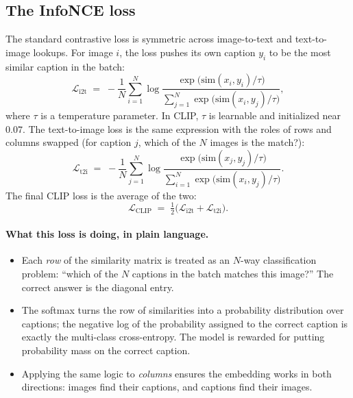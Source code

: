 \documentclass[11pt]{article}
\theoremstyle{remark}
\newcommand{\simop}{\mathrm{sim}}
\begin{document}
\subsection{The InfoNCE loss}
The standard contrastive loss is symmetric across image-to-text and text-to-image lookups. For image $i$, the loss pushes its own caption $y_i$ to be the most similar caption in the batch:
\begin{equation}
\mathcal{L}_{\text{i2t}} \;=\; -\frac{1}{N}\sum_{i=1}^{N} \log
\frac{\exp\!\big(\simop(x_i, y_i)/\tau\big)}{\sum_{j=1}^{N}\exp\!\big(\simop(x_i, y_j)/\tau\big)},
\label{eq:i2t}
\end{equation}
where $\tau$ is a temperature parameter. In CLIP, $\tau$ is learnable and initialized near $0.07$. The text-to-image loss is the same expression with the roles of rows and columns swapped (for caption $j$, which of the $N$ images is the match?):
\begin{equation}
\mathcal{L}_{\text{t2i}} \;=\; -\frac{1}{N}\sum_{j=1}^{N} \log
\frac{\exp\!\big(\simop(x_j, y_j)/\tau\big)}{\sum_{i=1}^{N}\exp\!\big(\simop(x_i, y_j)/\tau\big)}.
\label{eq:t2i}
\end{equation}
The final CLIP loss is the average of the two:
\begin{equation}
\mathcal{L}_{\text{CLIP}} \;=\; \tfrac{1}{2}\big(\mathcal{L}_{\text{i2t}} + \mathcal{L}_{\text{t2i}}\big).
\label{eq:clip}
\end{equation}

\paragraph{What this loss is doing, in plain language.}
\begin{itemize}[leftmargin=1.4em]
  \item Each \emph{row} of the similarity matrix is treated as an $N$-way classification problem: ``which of the $N$ captions in the batch matches this image?'' The correct answer is the diagonal entry.
  \item The softmax turns the row of similarities into a probability distribution over captions; the negative log of the probability assigned to the correct caption is exactly the multi-class cross-entropy. The model is rewarded for putting probability mass on the correct caption.
  \item Applying the same logic to \emph{columns} ensures the embedding works in both directions: images find their captions, and captions find their images.
\end{itemize}
\end{document}
